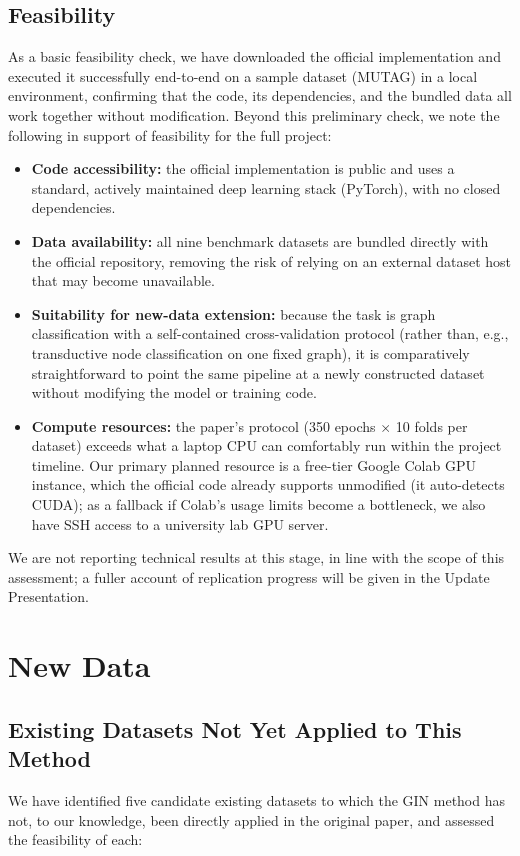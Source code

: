 \documentclass[11pt]{article}
\begin{document}
\subsection{Feasibility}
As a basic feasibility check, we have downloaded the official implementation and executed it successfully end-to-end on a sample dataset (MUTAG) in a local environment, confirming that the code, its dependencies, and the bundled data all work together without modification. Beyond this preliminary check, we note the following in support of feasibility for the full project:
\begin{itemize}
    \item \textbf{Code accessibility:} the official implementation is public and uses a standard, actively maintained deep learning stack (PyTorch), with no closed dependencies.
    \item \textbf{Data availability:} all nine benchmark datasets are bundled directly with the official repository, removing the risk of relying on an external dataset host that may become unavailable.
    \item \textbf{Suitability for new-data extension:} because the task is graph classification with a self-contained cross-validation protocol (rather than, e.g., transductive node classification on one fixed graph), it is comparatively straightforward to point the same pipeline at a newly constructed dataset without modifying the model or training code.
    \item \textbf{Compute resources:} the paper's protocol (350 epochs $\times$ 10 folds per dataset) exceeds what a laptop CPU can comfortably run within the project timeline. Our primary planned resource is a free-tier Google Colab GPU instance, which the official code already supports unmodified (it auto-detects CUDA); as a fallback if Colab's usage limits become a bottleneck, we also have SSH access to a university lab GPU server.
\end{itemize}
We are not reporting technical results at this stage, in line with the scope of this assessment; a fuller account of replication progress will be given in the Update Presentation.

\section{New Data}
\label{sec:newdata}

\subsection{Existing Datasets Not Yet Applied to This Method}
\label{sec:newdata1}
We have identified five candidate existing datasets to which the GIN method has not, to our knowledge, been directly applied in the original paper, and assessed the feasibility of each:
\end{document}
